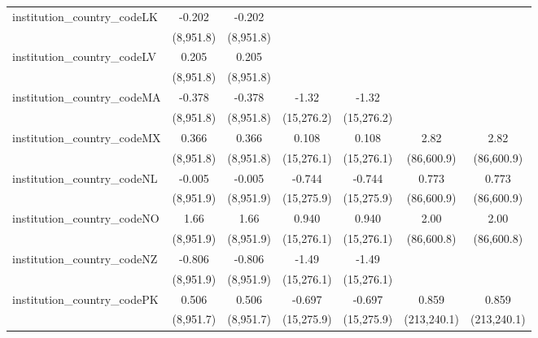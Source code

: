 \begin{tabular}{lcccccc}
   institution\_country\_codeLK          & -0.202        & -0.202        &               &               &              &   \\   
                                         & (8,951.8)     & (8,951.8)     &               &               &              &   \\   
   institution\_country\_codeLV          & 0.205         & 0.205         &               &               &              &   \\   
                                         & (8,951.8)     & (8,951.8)     &               &               &              &   \\   
   institution\_country\_codeMA          & -0.378        & -0.378        & -1.32         & -1.32         &              &   \\   
                                         & (8,951.8)     & (8,951.8)     & (15,276.2)    & (15,276.2)    &              &   \\   
   institution\_country\_codeMX          & 0.366         & 0.366         & 0.108         & 0.108         & 2.82         & 2.82\\   
                                         & (8,951.8)     & (8,951.8)     & (15,276.1)    & (15,276.1)    & (86,600.9)   & (86,600.9)\\   
   institution\_country\_codeNL          & -0.005        & -0.005        & -0.744        & -0.744        & 0.773        & 0.773\\   
                                         & (8,951.9)     & (8,951.9)     & (15,275.9)    & (15,275.9)    & (86,600.9)   & (86,600.9)\\   
   institution\_country\_codeNO          & 1.66          & 1.66          & 0.940         & 0.940         & 2.00         & 2.00\\   
                                         & (8,951.9)     & (8,951.9)     & (15,276.1)    & (15,276.1)    & (86,600.8)   & (86,600.8)\\   
   institution\_country\_codeNZ          & -0.806        & -0.806        & -1.49         & -1.49         &              &   \\   
                                         & (8,951.9)     & (8,951.9)     & (15,276.1)    & (15,276.1)    &              &   \\   
   institution\_country\_codePK          & 0.506         & 0.506         & -0.697        & -0.697        & 0.859        & 0.859\\   
                                         & (8,951.7)     & (8,951.7)     & (15,275.9)    & (15,275.9)    & (213,240.1)  & (213,240.1)\\   

\end{tabular}
